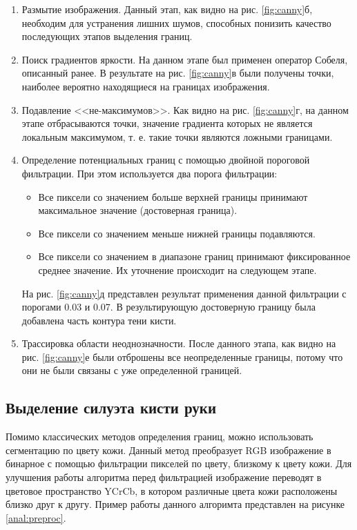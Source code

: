 \begin{enumerate}
	\item Размытие изображения. Данный этап, как видно на рис. \ref{fig:canny}б, необходим для устранения лишних шумов, способных понизить качество последующих	этапов выделения границ.
	\item Поиск градиентов яркости. На данном этапе был применен оператор Собеля, описанный ранее. В результате на рис. \ref{fig:canny}в были получены точки, наиболее вероятно находящиеся на границах изображения\cite{Suharjito}.
	\item Подавление <<не-максимумов>>. Как видно на рис. \ref{fig:canny}г, на данном этапе отбрасываются точки, значение градиента которых не является локальным максимумом, т. е. такие точки являются ложными границами.
	\item Определение потенциальных границ с помощью двойной пороговой фильтрации. При этом используется два порога фильтрации:
	\begin{itemize}
		\item Все пиксели со значением больше верхней границы принимают максимальное значение (достоверная граница).
		\item Все пиксели со значением меньше нижней границы подавляются.
		\item Все пиксели со значением в диапазоне границ принимают фиксированное среднее значение. Их уточнение происходит на следующем этапе.
	\end{itemize}
	На рис. \ref{fig:canny}д представлен результат применения данной фильтрации с порогами 0.03 и 0.07. В результирующую достоверную границу была добавлена часть контура тени кисти.
	\item Трассировка области неоднозначности. После данного этапа, как видно на рис. \ref{fig:canny}е были отброшены все неопределенные границы, потому что они не были связаны с уже определенной границей.
\end{enumerate}

\subsection{Выделение силуэта кисти руки}
\label{cha:syl}
Помимо классических методов определения границ, можно использовать сегментацию по цвету кожи\cite{Phung}. Данный метод преобразует RGB изображение в бинарное с помощью фильтрации пикселей по цвету, близкому к цвету кожи. Для улучшения работы алгоритма перед фильтрацией изображение переводят в цветовое пространство YCrCb, в котором различные цвета кожи расположены близко друг к другу\cite{Siddharth}. Пример работы данного алгоримта представлен на рисунке \ref{anal:preproc}.


